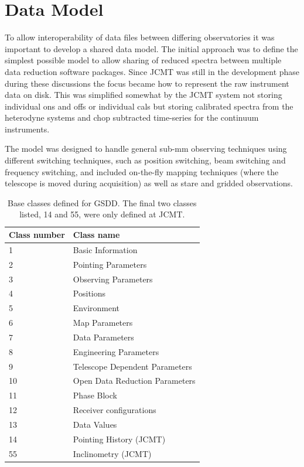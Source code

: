 \documentclass[final,authoryear,5p,times,twocolumn]{elsarticle}
\begin{document}
\section{Data Model}

To allow interoperability of data files between differing
observatories it was important to develop a shared data model. The
initial approach was to define the simplest possible model to allow
sharing of reduced spectra between multiple data reduction software
packages. Since JCMT was still in the development phase during these
discussions the focus became how to represent the raw instrument data
on disk. This was simplified somewhat by the JCMT system not storing
individual ons and offs or individual cals but storing calibrated
spectra from the heterodyne systems and chop subtracted time-series
for the continuum instruments.

The model was designed to handle general sub-mm observing techniques
using different switching techniques, such as position switching, beam
switching and frequency switching, and included on-the-fly mapping
techniques (where the telescope is moved during acquisition) as well
as stare and gridded observations.

\begin{table}
\caption{Base classes defined for GSDD. The final two classes listed,
  14 and 55, were only defined at JCMT.}
\label{tab:classes}
\begin{center}
\begin{tabular}{ll}
\hline
Class number &Class name \\ \hline
1         & Basic Information \\
2         & Pointing Parameters  \\
3         & Observing Parameters \\
4         & Positions \\
5         & Environment \\
6         & Map Parameters \\
7         & Data Parameters \\
8         & Engineering Parameters \\
9         & Telescope Dependent Parameters \\
10        & Open Data Reduction Parameters \\
11        & Phase Block \\
12        & Receiver configurations\\
13        & Data Values \\
14        & Pointing History (JCMT) \\
55        & Inclinometry (JCMT)\\
\hline
\end{tabular}
\end{center}
\end{table}
\end{document}
